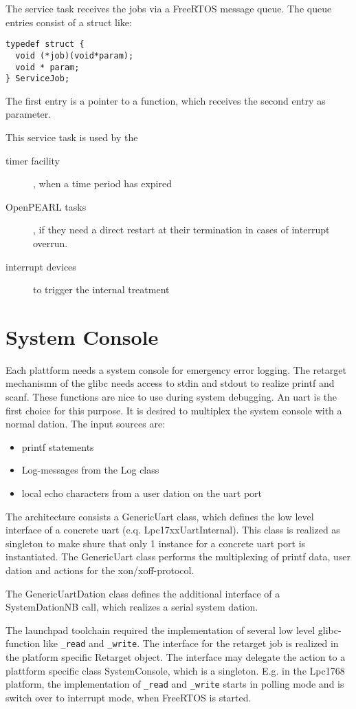 The service task receives the jobs via a FreeRTOS message queue. 
The queue entries consist of a struct like:
\begin{verbatim}
typedef struct { 
  void (*job)(void*param);
  void * param;
} ServiceJob;
\end{verbatim}
The first entry is a pointer to a function, which receives the second entry
as parameter.

This service task is used by the
\begin{description}
\item[timer facility], when a time period has expired
\item[OpenPEARL tasks], if they need a direct restart at their
     termination in cases of interrupt overrun.
\item[interrupt devices] to trigger the internal treatment
\end{description}

\section{System Console}
Each plattform needs a system console for emergency error logging.
The retarget mechanismn of the glibc needs access to stdin and stdout
to realize printf and scanf. These functions are nice to use during 
system debugging.
An uart is the first choice for this purpose. It is desired to multiplex
the system console with a normal dation. The input sources are:
\begin{itemize}
\item printf statements
\item Log-messages from the Log class
\item local echo characters from a user dation on the uart port
\end{itemize}

The  architecture consists a GenericUart class, which defines the low 
level interface 
of a concrete uart (e.q. Lpc17xxUartInternal). This class is
realized as singleton to make shure that only 1 instance for a 
concrete uart port is instantiated.
The GenericUart class performs the multiplexing of printf data,
user dation and actions for the xon/xoff-protocol.

The GenericUartDation class defines the additional interface of a
SystemDationNB call, which realizes a serial system dation. 

The launchpad toolchain required the implementation of several
low level glibc-function like  \verb|_read| and \verb|_write|.
The interface for the retarget job is realized in the platform
 specific Retarget object.
The interface may delegate the action  to a plattform specific class SystemConsole, which
is a singleton. 
E.g. in the Lpc1768 platform, the implementation of \verb|_read| and 
\verb|_write| starts in polling mode
and is switch over to interrupt mode, when FreeRTOS is started.

